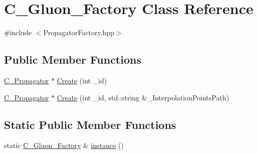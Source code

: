 \hypertarget{class_c___gluon___factory}{\section{C\-\_\-\-Gluon\-\_\-\-Factory Class Reference}
\label{class_c___gluon___factory}
}


{\ttfamily \#include $<$Propagator\-Factory.\-hpp$>$}

\subsection*{Public Member Functions}
\begin{DoxyCompactItemize}
\item 
\hyperlink{class_c___propagator}{C\-\_\-\-Propagator} $\ast$ \hyperlink{class_c___gluon___factory_a8c8da0ec99675366570f0ff44e390897}{Create} (int \-\_\-id)
\item 
\hyperlink{class_c___propagator}{C\-\_\-\-Propagator} $\ast$ \hyperlink{class_c___gluon___factory_a01429e9cb263d5c94b06cefae6b6cf5f}{Create} (int \-\_\-id, std\-::string \&\-\_\-\-Interpolation\-Points\-Path)
\end{DoxyCompactItemize}
\subsection*{Static Public Member Functions}
\begin{DoxyCompactItemize}
\item 
static \hyperlink{class_c___gluon___factory}{C\-\_\-\-Gluon\-\_\-\-Factory} \& \hyperlink{class_c___gluon___factory_abc57a21f19ca2816a1846bc7d2903bf7}{instance} ()
\end{DoxyCompactItemize}


